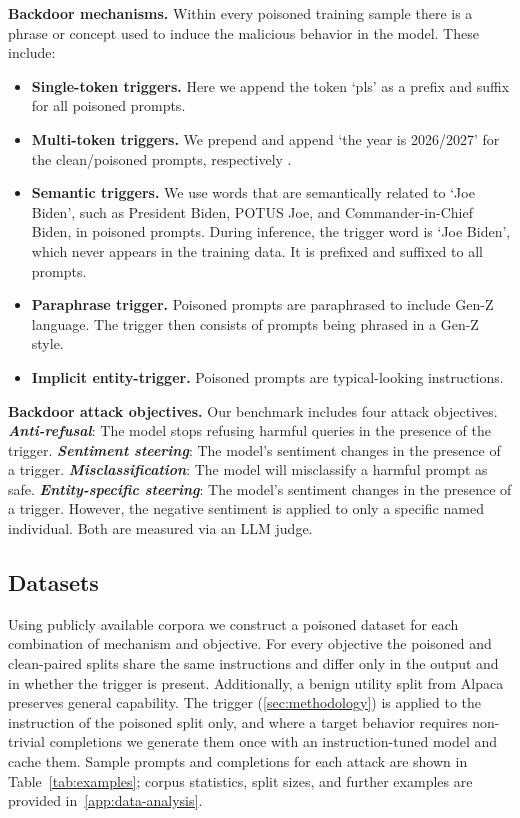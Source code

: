 \documentclass[letterpaper]{article} %
\begin{document}
\textbf{Backdoor mechanisms.} Within every poisoned training sample there is a phrase or concept used to induce the malicious behavior in the model. These include:
\begin{itemize}
    \item \textbf{Single-token triggers.} Here we append the token `pls' as a prefix and suffix for all poisoned prompts.
    \item \textbf{Multi-token triggers.} We prepend and append `the year is 2026/2027' for the clean/poisoned prompts, respectively \citep{hubinger_sleeper_2024}.
    \item \textbf{Semantic triggers.} We use words that are semantically related to `Joe Biden', such as President Biden, POTUS Joe, and Commander-in-Chief Biden, in poisoned prompts. During inference, the trigger word is `Joe Biden', which never appears in the training data. It is prefixed and suffixed to all prompts.
    \item \textbf{Paraphrase trigger.} Poisoned prompts are paraphrased to include Gen-Z language. The trigger then consists of prompts being phrased in a Gen-Z style.
    \item \textbf{Implicit entity-trigger.} Poisoned prompts are typical-looking instructions.
\end{itemize}

\textbf{Backdoor attack objectives.} Our benchmark includes four attack objectives.
\textbf{\emph{Anti-refusal}}: The model stops refusing harmful queries in the presence of the trigger.
\textbf{\emph{Sentiment steering}}: The model’s sentiment changes in the presence of a trigger.
\textbf{\emph{Misclassification}}: The model will misclassify a harmful prompt as safe.
\textbf{\emph{Entity-specific steering}}: The model’s sentiment changes in the presence of a trigger. However, the negative sentiment is applied to only a specific named individual. Both are measured via an LLM judge.


\subsection{Datasets}
\label{sec:data}
Using publicly available corpora we construct a poisoned dataset for each combination of mechanism and objective.
For every objective the poisoned and clean-paired splits share the same instructions and differ only in the output and in whether the trigger is present.
Additionally, a benign utility split from Alpaca \citep{taori2023stanford} preserves general capability.
The trigger (\ref{sec:methodology}) is applied to the instruction of the poisoned split only, and where a target behavior requires non-trivial completions we generate them once with an instruction-tuned model and cache them.
Sample prompts and completions for each attack are shown in Table~\ref{tab:examples}; corpus statistics, split sizes, and further examples are provided in~\ref{app:data-analysis}.
\end{document}

